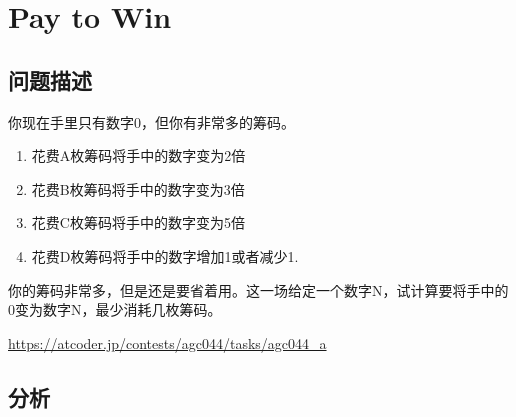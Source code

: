 \section{Pay to Win}
\subsection{问题描述}
你现在手里只有数字0，但你有非常多的筹码。

\begin{enumerate}
    \item 花费A枚筹码将手中的数字变为2倍
    \item 花费B枚筹码将手中的数字变为3倍
    \item 花费C枚筹码将手中的数字变为5倍
    \item 花费D枚筹码将手中的数字增加1或者减少1.
\end{enumerate}

你的筹码非常多，但是还是要省着用。这一场给定一个数字N，试计算要将手中的0变为数字N，最少消耗几枚筹码。

\url{https://atcoder.jp/contests/agc044/tasks/agc044_a}

\subsection{分析}


